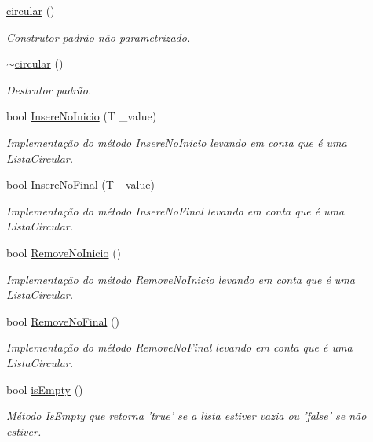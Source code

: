 \begin{DoxyCompactItemize}
\item 
\hyperlink{classcircular_a2109cd64f59adca8c8dd367b26d24c3a}{circular} ()
\begin{DoxyCompactList}\small\item\em Construtor padrão não-\/parametrizado. \end{DoxyCompactList}\item 
\hyperlink{classcircular_a5a56ab12c24627189befe04ab8741f7e}{$\sim$circular} ()
\begin{DoxyCompactList}\small\item\em Destrutor padrão. \end{DoxyCompactList}\item 
bool \hyperlink{classcircular_aa18b6a493a681c90eaabe7b5597514d9}{Insere\-No\-Inicio} (T \-\_\-value)
\begin{DoxyCompactList}\small\item\em Implementação do método Insere\-No\-Inicio levando em conta que é uma Lista\-Circular. \end{DoxyCompactList}\item 
bool \hyperlink{classcircular_a49afe6a8f71dbe8f21f671c2c9f522cb}{Insere\-No\-Final} (T \-\_\-value)
\begin{DoxyCompactList}\small\item\em Implementação do método Insere\-No\-Final levando em conta que é uma Lista\-Circular. \end{DoxyCompactList}\item 
bool \hyperlink{classcircular_a3b5c927d660a5089529f47df1195651b}{Remove\-No\-Inicio} ()
\begin{DoxyCompactList}\small\item\em Implementação do método Remove\-No\-Inicio levando em conta que é uma Lista\-Circular. \end{DoxyCompactList}\item 
bool \hyperlink{classcircular_a1d8e0afadcf7bd20de49d1d52441f0d5}{Remove\-No\-Final} ()
\begin{DoxyCompactList}\small\item\em Implementação do método Remove\-No\-Final levando em conta que é uma Lista\-Circular. \end{DoxyCompactList}\item 
bool \hyperlink{classcircular_a19f2b4d06f2fd26ecc81d841fe947fca}{is\-Empty} ()
\begin{DoxyCompactList}\small\item\em Método Is\-Empty que retorna 'true' se a lista estiver vazia ou 'false' se não estiver. \end{DoxyCompactList}\item 

\end{DoxyCompactItemize}
